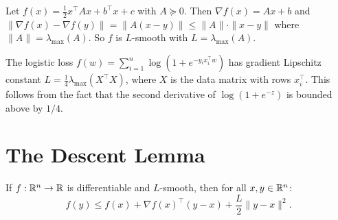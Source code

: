 \documentclass[11pt,a4paper]{article}
\begin{document}
\begin{example}\label{ex:smooth-quad}
Let $f(x) = \frac{1}{2}x^\top A x + b^\top x + c$ with $A \succeq 0$.
Then $\nabla f(x) = Ax + b$ and
$\|\nabla f(x) - \nabla f(y)\| = \|A(x-y)\| \le \|A\| \cdot \|x-y\|$
where $\|A\| = \lambda_{\max}(A)$. So $f$ is $L$-smooth with
$L = \lambda_{\max}(A)$.
\end{example}

\begin{example}\label{ex:smooth-logistic}
The logistic loss $f(w) = \sum_{i=1}^n \log(1 + e^{-y_i x_i^\top w})$
has gradient Lipschitz constant $L = \frac{1}{4}\lambda_{\max}(X^\top X)$,
where $X$ is the data matrix with rows $x_i^\top$. This follows from the
fact that the second derivative of $\log(1 + e^{-z})$ is bounded above
by $1/4$.
\end{example}


\section{The Descent Lemma}\label{sec:descent-lemma}

\begin{theorem}\label{thm:descent-lemma}
If $f : \mathbb{R}^n \to \mathbb{R}$ is differentiable and $L$-smooth, then for all
$x, y \in \mathbb{R}^n$:
\begin{equation}\label{eq:descent-lemma}
  f(y) \le f(x) + \nabla f(x)^\top(y - x) + \frac{L}{2}\|y - x\|^2.
\end{equation}
\end{theorem}
\end{document}
